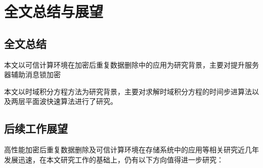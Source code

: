 \chapter{全文总结与展望}

\section{全文总结}

本文以可信计算环境在加密后重复数据删除中的应用为研究背景，主要对提升服务器辅助消息锁加密

本文以时域积分方程方法为研究背景，主要对求解时域积分方程的时间步进算法以及两层平面波快速算法进行了研究。

\section{后续工作展望}

高性能加密后重复数据删除及可信计算环境在存储系统中的应用等相关研究近几年发展迅速，在本文研究工作的基础上，仍有以下方向值得进一步研究：

